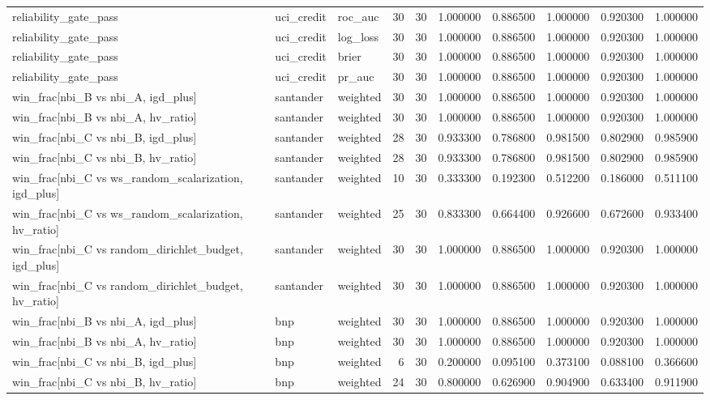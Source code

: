 \begin{longtable}{lllrrrrrrr}
reliability\_gate\_pass & uci\_credit & roc\_auc & 30 & 30 & 1.000000 & 0.886500 & 1.000000 & 0.920300 & 1.000000 \\
reliability\_gate\_pass & uci\_credit & log\_loss & 30 & 30 & 1.000000 & 0.886500 & 1.000000 & 0.920300 & 1.000000 \\
reliability\_gate\_pass & uci\_credit & brier & 30 & 30 & 1.000000 & 0.886500 & 1.000000 & 0.920300 & 1.000000 \\
reliability\_gate\_pass & uci\_credit & pr\_auc & 30 & 30 & 1.000000 & 0.886500 & 1.000000 & 0.920300 & 1.000000 \\
win\_frac[nbi\_B vs nbi\_A, igd\_plus] & santander & weighted & 30 & 30 & 1.000000 & 0.886500 & 1.000000 & 0.920300 & 1.000000 \\
win\_frac[nbi\_B vs nbi\_A, hv\_ratio] & santander & weighted & 30 & 30 & 1.000000 & 0.886500 & 1.000000 & 0.920300 & 1.000000 \\
win\_frac[nbi\_C vs nbi\_B, igd\_plus] & santander & weighted & 28 & 30 & 0.933300 & 0.786800 & 0.981500 & 0.802900 & 0.985900 \\
win\_frac[nbi\_C vs nbi\_B, hv\_ratio] & santander & weighted & 28 & 30 & 0.933300 & 0.786800 & 0.981500 & 0.802900 & 0.985900 \\
win\_frac[nbi\_C vs ws\_random\_scalarization, igd\_plus] & santander & weighted & 10 & 30 & 0.333300 & 0.192300 & 0.512200 & 0.186000 & 0.511100 \\
win\_frac[nbi\_C vs ws\_random\_scalarization, hv\_ratio] & santander & weighted & 25 & 30 & 0.833300 & 0.664400 & 0.926600 & 0.672600 & 0.933400 \\
win\_frac[nbi\_C vs random\_dirichlet\_budget, igd\_plus] & santander & weighted & 30 & 30 & 1.000000 & 0.886500 & 1.000000 & 0.920300 & 1.000000 \\
win\_frac[nbi\_C vs random\_dirichlet\_budget, hv\_ratio] & santander & weighted & 30 & 30 & 1.000000 & 0.886500 & 1.000000 & 0.920300 & 1.000000 \\
win\_frac[nbi\_B vs nbi\_A, igd\_plus] & bnp & weighted & 30 & 30 & 1.000000 & 0.886500 & 1.000000 & 0.920300 & 1.000000 \\
win\_frac[nbi\_B vs nbi\_A, hv\_ratio] & bnp & weighted & 30 & 30 & 1.000000 & 0.886500 & 1.000000 & 0.920300 & 1.000000 \\
win\_frac[nbi\_C vs nbi\_B, igd\_plus] & bnp & weighted & 6 & 30 & 0.200000 & 0.095100 & 0.373100 & 0.088100 & 0.366600 \\
win\_frac[nbi\_C vs nbi\_B, hv\_ratio] & bnp & weighted & 24 & 30 & 0.800000 & 0.626900 & 0.904900 & 0.633400 & 0.911900 \\

\end{longtable}
